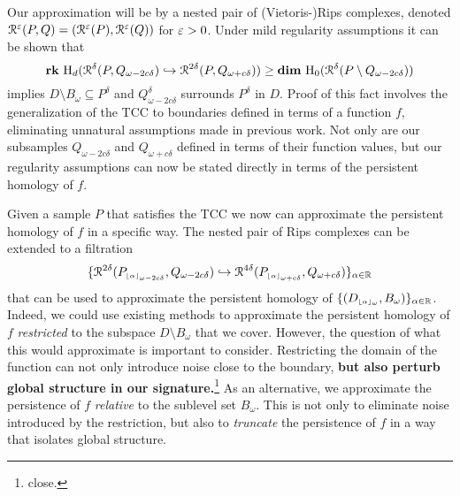 Our approximation will be by a nested pair of (Vietoris-)Rips complexes, denoted $\mathcal{R}^\varepsilon(P, Q) = (\mathcal{R}^\varepsilon(P), \mathcal{R}^\varepsilon(Q))$ for $\varepsilon > 0$.
Under mild regularity assumptions it can be shown that
\[ \mathbf{rk}~\mathrm{H}_d(\mathcal{R}^\delta(P, Q_{\omega - 2c\delta})\hookrightarrow \mathcal{R}^{2\delta}(P, Q_{\omega+c\delta}))\geq \mathbf{dim}~\mathrm{H}_0(\mathcal{R}^\delta(P\setminus Q_{\omega-2c\delta}))\]
implies $D\setminus B_\omega\subseteq P^\delta$ and $Q_{\omega-2c\delta}^\delta$ surrounds $P^\delta$ in $D$.
Proof of this fact involves the generalization of the TCC to boundaries defined in terms of a function $f$, eliminating unnatural assumptions made in previous work.
Not only are our subsamples $Q_{\omega-2c\delta}$ and $Q_{\omega+c\delta}$ defined in terms of their function values, but our regularity assumptions can now be stated directly in terms of the persistent homology of $f$.

Given a sample $P$ that satisfies the TCC we now can approximate the persistent homology of $f$ in a specific way.
The nested pair of Rips complexes can be extended to a filtration
\[ \{\mathcal{R}^{2\delta}(P_{\scriptscriptstyle \lfloor\alpha\rfloor_{\omega-2c\delta}}, Q_{\omega-2c\delta})\hookrightarrow \mathcal{R}^{4\delta}(P_{\scriptscriptstyle \lfloor\alpha\rfloor_{\omega+c\delta}}, Q_{\omega+c\delta})\}_{\alpha\in\mathbb{R}}\]
that can be used to approximate the persistent homology of $\{(D_{\scriptscriptstyle \lfloor\alpha\rfloor_{\omega}}, B_\omega)\}_{\alpha\in\mathbb{R}}$.
Indeed, we could use existing methods to approximate the persistent homology of $f$ \emph{restricted} to the subspace $D\setminus B_\omega$ that we cover.
However, the question of what this would approximate is important to consider.
{\color{red} Restricting the domain of the function can not only introduce noise close to the boundary, \textbf{but also perturb global structure in our signature.}\footnote{\color{red} close.}}
As an alternative, we approximate the persistence of $f$ \emph{relative} to the sublevel set $B_\omega$.
This is not only to eliminate noise introduced by the restriction, but also to \emph{truncate} the persistence of $f$ in a way that isolates global structure.

